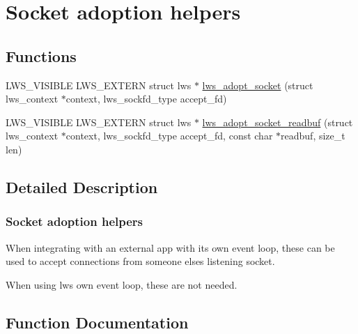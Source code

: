 \hypertarget{group__sock-adopt}{}\section{Socket adoption helpers}
\label{group__sock-adopt}
\subsection*{Functions}
\begin{DoxyCompactItemize}
\item 
L\+W\+S\+\_\+\+V\+I\+S\+I\+B\+LE L\+W\+S\+\_\+\+E\+X\+T\+E\+RN struct lws $\ast$ \hyperlink{group__sock-adopt_gabe71b7462afb21c767bdc67334f305af}{lws\+\_\+adopt\+\_\+socket} (struct lws\+\_\+context $\ast$context, lws\+\_\+sockfd\+\_\+type accept\+\_\+fd)
\item 
L\+W\+S\+\_\+\+V\+I\+S\+I\+B\+LE L\+W\+S\+\_\+\+E\+X\+T\+E\+RN struct lws $\ast$ \hyperlink{group__sock-adopt_gab2d045df0f81afe00891aaed312d552b}{lws\+\_\+adopt\+\_\+socket\+\_\+readbuf} (struct lws\+\_\+context $\ast$context, lws\+\_\+sockfd\+\_\+type accept\+\_\+fd, const char $\ast$readbuf, size\+\_\+t len)
\end{DoxyCompactItemize}


\subsection{Detailed Description}
\subsubsection*{Socket adoption helpers}

When integrating with an external app with its own event loop, these can be used to accept connections from someone else\textquotesingle{}s listening socket.

When using lws own event loop, these are not needed. 

\subsection{Function Documentation}
